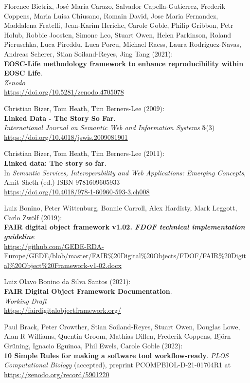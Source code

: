 \begin{thebibliography}{9}
Florence Bietrix, José Maria Carazo, Salvador
Capella-Gutierrez, Frederik Coppens, Maria Luisa Chiusano, Romain David,
Jose Maria Fernandez, Maddalena Fratelli, Jean-Karim Heriche, Carole
Goble, Philip Gribbon, Petr Holub, Robbie Joosten, Simone Leo, Stuart
Owen, Helen Parkinson, Roland Pieruschka, Luca Pireddu, Luca Porcu,
Michael Raess, Laura Rodriguez-Navas, Andreas Scherer, Stian
Soiland-Reyes, Jing Tang (2021):\\
\textbf{EOSC-Life methodology framework to enhance reproducibility
within EOSC Life}.\\
\emph{Zenodo}\\
\url{https://doi.org/10.5281/zenodo.4705078}

Christian Bizer, Tom Heath, Tim Berners-Lee (2009):\\
\textbf{Linked Data - The Story So Far}.\\
\emph{International Journal on Semantic Web and Information Systems}
\textbf{5}(3)\\
\url{https://doi.org/10.4018/jswis.2009081901}

Christian Bizer, Tom Heath, Tim Berners-Lee (2011):\\
\textbf{Linked data: The story so far}.\\
In \emph{Semantic Services, Interoperability and Web Applications:
Emerging Concepts}, Amit Sheth (ed.) ISBN 9781609605933\\
\url{https://doi.org/10.4018/978-1-60960-593-3.ch008}

Luiz Bonino, Peter Wittenburg, Bonnie Carroll, Alex
Hardisty, Mark Leggott, Carlo Zwölf (2019):\\
\textbf{FAIR digital object framework v1.02. \emph{FDOF technical
implementation guideline}}\\
\url{https://github.com/GEDE-RDA-Europe/GEDE/blob/master/FAIR\%20Digital\%20Objects/FDOF/FAIR\%20Digital\%20Object\%20Framework-v1-02.docx}

Luiz Olavo Bonino da Silva Santos (2021):\\
\textbf{FAIR Digital Object Framework Documentation}.\\
\emph{Working Draft}\\
\url{https://fairdigitalobjectframework.org/}

Paul Brack, Peter Crowther, Stian Soiland-Reyes, Stuart Owen,
Douglas Lowe, Alan R Williams, Quentin Groom, Mathias Dillen, Frederik
Coppens, Björn Grüning, Ignacio Eguinoa, Phil Ewels, Carole Goble
(2022):\\
\textbf{10 Simple Rules for making a software tool workflow-ready}.
\emph{PLOS Computational Biology} (accepted), preprint
PCOMPBIOL-D-21-01704R1 at \url{https://zenodo.org/record/5901220}


\end{thebibliography}
